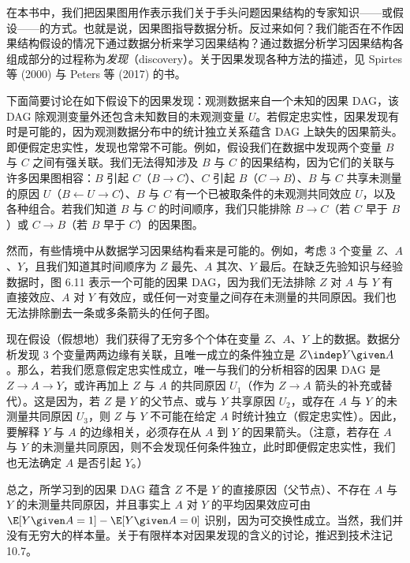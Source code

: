 \begin{finepoint}[因果结构的发现]
在本书中，我们把因果图用作表示我们关于手头问题因果结构的专家知识——或假设——的方式。也就是说，因果图指导数据分析。反过来如何？我们能否在不作因果结构假设的情况下通过数据分析来学习因果结构？通过数据分析学习因果结构各组成部分的过程称为\emph{发现}（discovery）。关于因果发现各种方法的描述，见 Spirtes 等 (2000) 与 Peters 等 (2017) 的书。

下面简要讨论在如下假设下的因果发现：观测数据来自一个未知的因果 DAG，该 DAG 除观测变量外还包含未知数目的未观测变量 $U$。若假定忠实性，因果发现有时是可能的，因为观测数据分布中的统计独立关系蕴含 DAG 上缺失的因果箭头。即便假定忠实性，发现也常常不可能。例如，假设我们在数据中发现两个变量 $B$ 与 $C$ 之间有强关联。我们无法得知涉及 $B$ 与 $C$ 的因果结构，因为它们的关联与许多因果图相容：$B$ 引起 $C$（$B\to C$）、$C$ 引起 $B$（$C\to B$）、$B$ 与 $C$ 共享未测量的原因 $U$（$B\leftarrow U\to C$）、$B$ 与 $C$ 有一个已被取条件的未观测共同效应 $U$，以及各种组合。若我们知道 $B$ 与 $C$ 的时间顺序，我们只能排除 $B\to C$（若 $C$ 早于 $B$）或 $C\to B$（若 $B$ 早于 $C$）的因果图。

然而，有些情境中从数据学习因果结构看来是可能的。例如，考虑 3 个变量 $Z$、$A$、$Y$，且我们知道其时间顺序为 $Z$ 最先、$A$ 其次、$Y$ 最后。在缺乏先验知识与经验数据时，图 6.11 表示一个可能的因果 DAG，因为我们无法排除 $Z$ 对 $A$ 与 $Y$ 有直接效应、$A$ 对 $Y$ 有效应，或任何一对变量之间存在未测量的共同原因。我们也无法排除删去一条或多条箭头的任何子图。

现在假设（假想地）我们获得了无穷多个个体在变量 $Z$、$A$、$Y$ 上的数据。数据分析发现 3 个变量两两边缘有关联，且唯一成立的条件独立是 $Z\indep Y\given A$。那么，若我们愿意假定忠实性成立，唯一与我们的分析相容的因果 DAG 是 $Z\to A\to Y$，或许再加上 $Z$ 与 $A$ 的共同原因 $U_1$（作为 $Z\to A$ 箭头的补充或替代）。这是因为，若 $Z$ 是 $Y$ 的父节点、或与 $Y$ 共享原因 $U_2$，或存在 $A$ 与 $Y$ 的未测量共同原因 $U_3$，则 $Z$ 与 $Y$ 不可能在给定 $A$ 时统计独立（假定忠实性）。因此，要解释 $Y$ 与 $A$ 的边缘相关，必须存在从 $A$ 到 $Y$ 的因果箭头。（注意，若存在 $A$ 与 $Y$ 的未测量共同原因，则不会发现任何条件独立，此时即便假定忠实性，我们也无法确定 $A$ 是否引起 $Y$。）

总之，所学习到的因果 DAG 蕴含 $Z$ 不是 $Y$ 的直接原因（父节点）、不存在 $A$ 与 $Y$ 的未测量共同原因，并且事实上 $A$ 对 $Y$ 的平均因果效应可由 $\E[Y\given A=1]-\E[Y\given A=0]$ 识别，因为可交换性成立。当然，我们并没有无穷大的样本量。关于有限样本对因果发现的含义的讨论，推迟到技术注记 10.7。


\end{finepoint}
